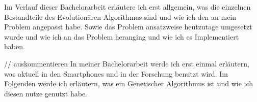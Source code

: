 
Im Verlauf dieser Bachelorarbeit erl{\"a}utere ich erst allgemein, was die einzelnen Bestandteile des Evolution{\"a}ren Algorithmus sind und wie ich den an mein Problem angepasst habe. Sowie das Problem ansatzweise heutzutage umgesetzt wurde und wie ich an das Problem heranging und wie ich es Implementiert haben.

// auskommentieren
In meiner Bachelorarbeit werde ich erst einmal erl{\"a}utern, was aktuell in den Smartphones und in der Forschung benutzt wird.
Im Folgenden werde ich erl{\"a}utern, was ein Genetischer Algorithmus ist und wie ich diesen nutze genutzt habe. 